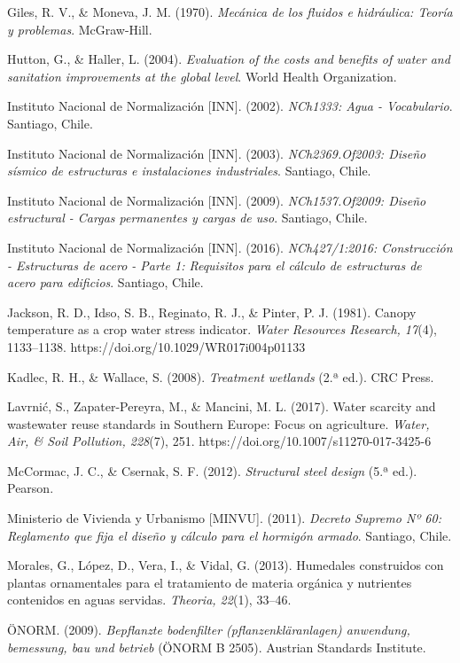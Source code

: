 \documentclass[12pt, letterpaper]{report}
\begin{document}
Giles, R. V., \& Moneva, J. M. (1970). \textit{Mecánica de los fluidos e hidráulica: Teoría y problemas}. McGraw-Hill.

Hutton, G., \& Haller, L. (2004). \textit{Evaluation of the costs and benefits of water and sanitation improvements at the global level}. World Health Organization.

Instituto Nacional de Normalización [INN]. (2002). \textit{NCh1333: Agua - Vocabulario}. Santiago, Chile.

Instituto Nacional de Normalización [INN]. (2003). \textit{NCh2369.Of2003: Diseño sísmico de estructuras e instalaciones industriales}. Santiago, Chile.

Instituto Nacional de Normalización [INN]. (2009). \textit{NCh1537.Of2009: Diseño estructural - Cargas permanentes y cargas de uso}. Santiago, Chile.

Instituto Nacional de Normalización [INN]. (2016). \textit{NCh427/1:2016: Construcción - Estructuras de acero - Parte 1: Requisitos para el cálculo de estructuras de acero para edificios}. Santiago, Chile.

Jackson, R. D., Idso, S. B., Reginato, R. J., \& Pinter, P. J. (1981). Canopy temperature as a crop water stress indicator. \textit{Water Resources Research, 17}(4), 1133--1138. https://doi.org/10.1029/WR017i004p01133

Kadlec, R. H., \& Wallace, S. (2008). \textit{Treatment wetlands} (2.ª ed.). CRC Press.

Lavrnić, S., Zapater-Pereyra, M., \& Mancini, M. L. (2017). Water scarcity and wastewater reuse standards in Southern Europe: Focus on agriculture. \textit{Water, Air, \& Soil Pollution, 228}(7), 251. https://doi.org/10.1007/s11270-017-3425-6

McCormac, J. C., \& Csernak, S. F. (2012). \textit{Structural steel design} (5.ª ed.). Pearson.

Ministerio de Vivienda y Urbanismo [MINVU]. (2011). \textit{Decreto Supremo Nº 60: Reglamento que fija el diseño y cálculo para el hormigón armado}. Santiago, Chile.

Morales, G., López, D., Vera, I., \& Vidal, G. (2013). Humedales construidos con plantas ornamentales para el tratamiento de materia orgánica y nutrientes contenidos en aguas servidas. \textit{Theoria, 22}(1), 33--46.

ÖNORM. (2009). \textit{Bepflanzte bodenfilter (pflanzenkläranlagen) anwendung, bemessung, bau und betrieb} (ÖNORM B 2505). Austrian Standards Institute.
\end{document}
